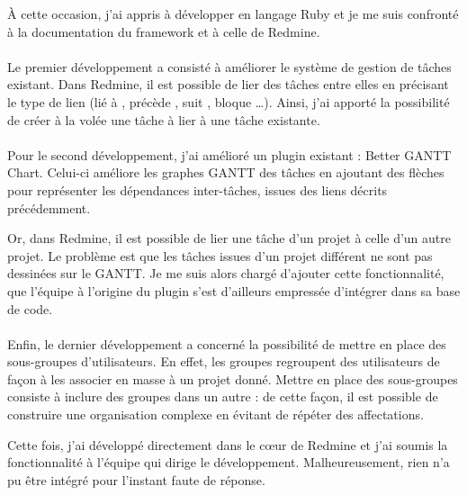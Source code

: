 À cette occasion, j'ai appris à développer en langage Ruby et je me suis confronté à la documentation du framework \aror{} et à celle de Redmine.

\paragraph{}
Le premier développement a consisté à améliorer le système de gestion de tâches existant.
Dans Redmine, il est possible de lier des tâches entre elles en précisant le type de lien (\og lié à \fg, \og précède \fg, \og suit \fg, \og bloque \fg\ldots).
Ainsi, j'ai apporté la possibilité de créer à la volée une tâche à lier à une tâche existante.

\paragraph{}
Pour le second développement, j'ai amélioré un plugin existant : Better GANTT Chart.
Celui-ci améliore les graphes GANTT des tâches en ajoutant des flèches pour représenter les dépendances inter-tâches, issues des liens décrits précédemment.

Or, dans Redmine, il est possible de lier une tâche d'un projet à celle d'un autre projet.
Le problème est que les tâches issues d'un projet différent ne sont pas dessinées sur le GANTT. 
Je me suis alors chargé d'ajouter cette fonctionnalité, que l'équipe à l'origine du plugin s'est d'ailleurs empressée d'intégrer dans sa base de code.

\paragraph{}
Enfin, le dernier développement a concerné la possibilité de mettre en place des sous-groupes d'utilisateurs.
En effet, les groupes regroupent des utilisateurs de façon à les associer en masse à un projet donné.
Mettre en place des sous-groupes consiste à inclure des groupes dans un autre : de cette façon, il est possible de construire une organisation complexe en évitant de répéter des affectations. 

Cette fois, j'ai développé directement dans le c\oe ur de Redmine et j'ai soumis la fonctionnalité à l'équipe qui dirige le développement.
Malheureusement, rien n'a pu être intégré pour l'instant faute de réponse.


